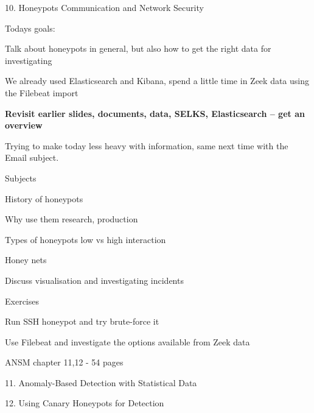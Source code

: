 \documentclass[Screen16to9,17pt]{foils}
\begin{document}
\mytitlepage
{10. Honeypots}
{Communication and Network Security \the\year}




Todays goals:
\begin{list2}
\item Talk about honeypots in general, but also how to get the right data for investigating
\item We already used Elasticsearch and Kibana, spend a little time in Zeek data using the Filebeat import
\item {\bf Revisit earlier slides, documents, data, SELKS, Elasticsearch -- get an overview}
\end{list2}

Trying to make today less heavy with information, same next time with the Email subject.




\begin{list1}
\item Subjects
\begin{list2}
\item History of honeypots
\item Why use them research, production
\item Types of honeypots low vs high interaction
\item Honey nets
\item Discuss visualisation and investigating incidents
\end{list2}
\item Exercises
\begin{list2}
\item Run SSH honeypot and try brute-force it
\item Use Filebeat and investigate the options available from Zeek data
\end{list2}
\end{list1}



\begin{list1}
\item ANSM chapter 11,12 - 54 pages
\item 11. Anomaly-Based Detection
with Statistical Data
\item 12. Using Canary Honeypots
for Detection
\end{list1}
\end{document}
